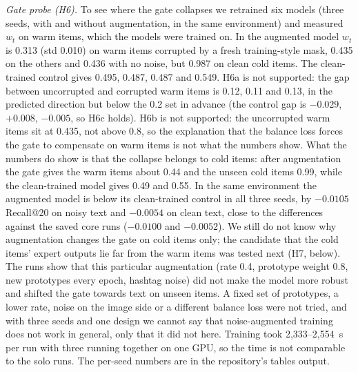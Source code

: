\documentclass[conference]{IEEEtran}
\begin{document}
\emph{Gate probe (H6).} To see where the gate collapses we retrained six models (three seeds, with and without augmentation, in the same environment) and measured $w_t$ on warm items, which the models were trained on. In the augmented model $w_t$ is 0.313 (std 0.010) on warm items corrupted by a fresh training-style mask, 0.435 on the others and 0.436 with no noise, but 0.987 on clean cold items. The clean-trained control gives 0.495, 0.487, 0.487 and 0.549. H6a is not supported: the gap between uncorrupted and corrupted warm items is 0.12, 0.11 and 0.13, in the predicted direction but below the 0.2 set in advance (the control gap is $-0.029$, $+0.008$, $-0.005$, so H6c holds). H6b is not supported: the uncorrupted warm items sit at 0.435, not above 0.8, so the explanation that the balance loss forces the gate to compensate on warm items is not what the numbers show. What the numbers do show is that the collapse belongs to cold items: after augmentation the gate gives the warm items about 0.44 and the unseen cold items 0.99, while the clean-trained model gives 0.49 and 0.55. In the same environment the augmented model is below its clean-trained control in all three seeds, by $-0.0105$ Recall@20 on noisy text and $-0.0054$ on clean text, close to the differences against the saved core runs ($-0.0100$ and $-0.0052$). We still do not know why augmentation changes the gate on cold items only; the candidate that the cold items' expert outputs lie far from the warm items was tested next (H7, below). The runs show that this particular augmentation (rate 0.4, prototype weight 0.8, new prototypes every epoch, hashtag noise) did not make the model more robust and shifted the gate towards text on unseen items. A fixed set of prototypes, a lower rate, noise on the image side or a different balance loss were not tried, and with three seeds and one design we cannot say that noise-augmented training does not work in general, only that it did not here. Training took 2,333--2,554~s per run with three running together on one GPU, so the time is not comparable to the solo runs. The per-seed numbers are in the repository's tables output.
\end{document}
